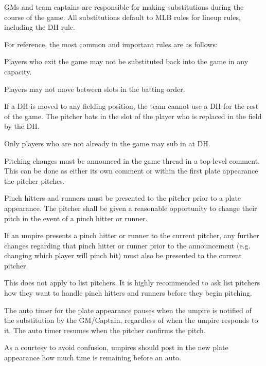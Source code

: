 \begin{deepEnumerate}
\begin{deepEnumerate}
		\item GMs and team captains are responsible for making substitutions during the course of the game.
		All substitutions default to MLB rules for lineup rules, including the DH rule.
		\begin{deepEnumerate}
			\item For reference, the most common and important rules are as follows:
			\begin{deepEnumerate}
				\item Players who exit the game may not be substituted back into the game in any capacity.
				\item Players may not move between slots in the batting order.
				\item If a DH is moved to any fielding position, the team cannot use a DH for the rest of the game. 
				The pitcher bats in the slot of the player who is replaced in the field by the DH.
				\item Only players who are not already in the game may sub in at DH.
			\end{deepEnumerate}
		\end{deepEnumerate}
		\item Pitching changes must be announced in the game thread in a top-level comment.  
		This can be done as either its own comment or within the first plate appearance the pitcher pitches.
		\item Pinch hitters and runners must be presented to the pitcher prior to a plate appearance. 
		The pitcher shall be given a reasonable opportunity to change their pitch in the event of a pinch hitter or runner.
		\begin{deepEnumerate}
			\item If an umpire presents a pinch hitter or runner to the current pitcher, any further changes regarding that pinch hitter or runner prior to the announcement 
			(e.g. changing which player will pinch hit) must also be presented to the current pitcher.
			\item This does not apply to list pitchers. It is highly recommended to ask list pitchers how they want to handle pinch hitters and runners before they begin pitching.
			\item The auto timer for the plate appearance pauses when the umpire is notified of the substitution by the GM/Captain, 
			regardless of when the umpire responds to it. The auto timer resumes when the pitcher confirms the pitch.
			\begin{deepEnumerate}
				\item As a courtesy to avoid confusion, umpires should post in the new plate appearance how much time is remaining before an auto.

\end{deepEnumerate}
\end{deepEnumerate}
\end{deepEnumerate}
\end{deepEnumerate}
